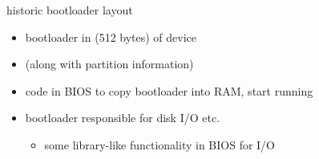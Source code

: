 \begin{frame}{historic bootloader layout}
    \begin{itemize}
    \item bootloader in  (512 bytes) of device
    \item (along with partition information)
    \item code in BIOS to copy bootloader into RAM, start running
    \item bootloader responsible for disk I/O etc.
        \begin{itemize}
        \item some library-like functionality in BIOS for I/O
        \end{itemize}
    \end{itemize}
\end{frame}

